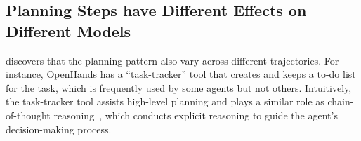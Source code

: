 \begin{table}[!t]
    \centering
    \caption{Verification procedure in a simple training task (e.g., function localization) transfers to more complex tasks (e.g., issue-solving). However, the effect of verification steps depends on the student and teacher model. 
    We highlight significant  and  in resolved rates (with p-value $< 0.05$).}
    \label{catradar:tab:verification-ablation}
\end{table}



\subsection{Planning Steps have Different Effects on Different Models}
\toolName discovers that the planning pattern also vary across different trajectories.
For instance, OpenHands has a ``task-tracker'' tool that creates and keeps a to-do list for the task, which is frequently used by some agents but not others.
Intuitively, the task-tracker tool assists high-level planning and plays a similar role as chain-of-thought reasoning~\citep{CoT}, which conducts explicit reasoning to guide the agent's decision-making process.

